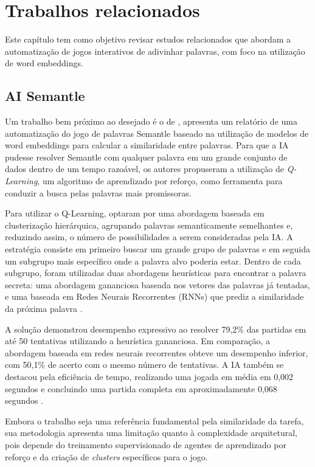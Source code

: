 \chapter{Trabalhos relacionados}

Este capítulo tem como objetivo revisar estudos relacionados que abordam a automatização de jogos interativos de adivinhar palavras, com foco na utilização de word embeddings.

\section{AI Semantle}

Um trabalho bem próximo ao desejado é o de , apresenta um relatório de uma automatização do jogo de palavras Semantle baseado na utilização de modelos de word embeddings para calcular a similaridade entre palavras. Para que a IA pudesse resolver Semantle com qualquer palavra em um grande conjunto de dados dentro de um tempo razoável, os autores propuseram a utilização de \textit{Q-Learning}, um algoritmo de aprendizado por reforço, como ferramenta para conduzir a busca pelas palavras mais promissoras.

Para utilizar o Q-Learning,  optaram por uma abordagem baseada em clusterização hierárquica, agrupando palavras semanticamente semelhantes e, reduzindo assim, o número de possibilidades a serem consideradas pela IA. A estratégia consiste em primeiro buscar um grande grupo de palavras e em seguida um subgrupo mais específico onde a palavra alvo poderia estar. Dentro de cada subgrupo, foram utilizadas duas abordagens heurísticas para encontrar a palavra secreta: uma abordagem gananciosa baseada nos vetores das palavras já tentadas, e uma baseada em Redes Neurais Recorrentes (RNNs) que prediz a similaridade da próxima palavra \cite{greenstein2022aisemantle}.

A solução demonstrou desempenho expressivo ao resolver 79,2\% das partidas em até 50 tentativas utilizando a heurística gananciosa. Em comparação, a abordagem baseada em redes neurais recorrentes obteve um desempenho inferior, com 50,1\% de acerto com o mesmo número de tentativas. A IA também se destacou pela eficiência de tempo, realizando uma jogada em média em 0,002 segundos e concluindo uma partida completa em aproximadamente 0,068 segundos \cite{greenstein2022aisemantle}.

Embora o trabalho seja uma referência fundamental pela similaridade da tarefa, sua metodologia apresenta uma limitação quanto à complexidade arquitetural, pois depende do treinamento supervisionado de agentes de aprendizado por reforço e da criação de \textit{clusters} específicos para o jogo. 

